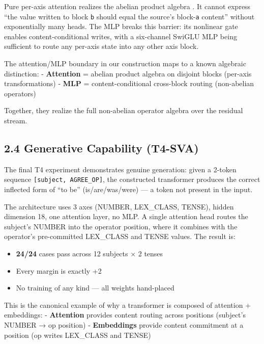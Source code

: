 \documentclass[
  twocolumn,
  10pt,
  a4paper]{article}
\providecommand{\tightlist}{%
  \setlength{\itemsep}{0pt}\setlength{\parskip}{0pt}}
\begin{document}
Pure per-axis attention realizes the abelian product algebra
\texttt{}. It cannot express ``the value written to
block \texttt{b} should equal the source's block-\texttt{a} content''
without exponentially many heads. The MLP breaks this barrier: its
nonlinear gate enables content-conditional writes, with a six-channel
SwiGLU MLP being sufficient to route any per-axis state into any other
axis block.

The attention/MLP boundary in our construction maps to a known algebraic
distinction: - \textbf{Attention} = abelian product algebra on disjoint
blocks (per-axis transformations) - \textbf{MLP} = content-conditional
cross-block routing (non-abelian operators)

Together, they realize the full non-abelian operator algebra over the
residual stream.

\hypertarget{generative-capability-t4-sva}{%
\subsection{2.4 Generative Capability
(T4-SVA)}\label{generative-capability-t4-sva}}

The final T4 experiment demonstrates genuine generation: given a 2-token
sequence \texttt{{[}subject,\ AGREE\_OP{]}}, the constructed transformer
produces the correct inflected form of ``to be'' (is/are/was/were) --- a
token not present in the input.

The architecture uses 3 axes (NUMBER, LEX\_CLASS, TENSE), hidden
dimension 18, one attention layer, no MLP. A single attention head
routes the subject's NUMBER into the operator position, where it
combines with the operator's pre-committed LEX\_CLASS and TENSE values.
The result is:

\begin{itemize}
\tightlist
\item
  \textbf{24/24} cases pass across 12 subjects × 2 tenses
\item
  Every margin is exactly +2
\item
  No training of any kind --- all weights hand-placed
\end{itemize}

This is the canonical example of why a transformer is composed of
attention + embeddings: - \textbf{Attention} provides content routing
across positions (subject's NUMBER → op position) - \textbf{Embeddings}
provide content commitment at a position (op writes LEX\_CLASS and
TENSE)
\end{document}
